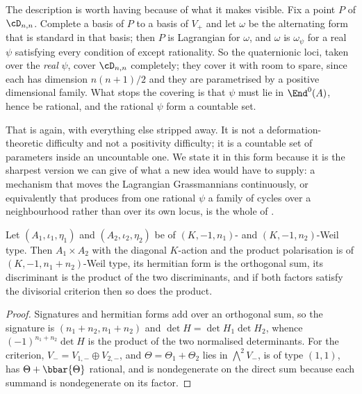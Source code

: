 \begin{remark}%
\label{rem:onlyrational}
The description is worth having because of what it makes visible. Fix a
point $P$ of $\cD_{n,n}$. Complete a basis of $P$ to a basis of $V_{+}$ and
let $\omega$ be the alternating form that is standard in that basis; then $P$
is Lagrangian for $\omega$, and $\omega$ is $\omega_{\psi}$ for a real
$\psi$ satisfying every condition of  except
rationality. So the quaternionic loci, taken over the \emph{real} $\psi$,
cover $\cD_{n,n}$ completely; they cover it with room to spare, since each
has dimension $n(n+1)/2$ and they are parametrised by a positive dimensional
family. What stops the covering is that $\psi$ must lie in
$\End^{0}(A)$, hence be rational, and the rational $\psi$ form a countable
set.

That is  again, with everything else stripped away. It
is not a deformation-theoretic difficulty and not a positivity difficulty;
it is a countable set of parameters inside an uncountable one. We state it in
this form because it is the sharpest version we can give of what a new idea
would have to supply: a mechanism that moves the Lagrangian Grassmannians
continuously, or equivalently that produces from one rational $\psi$ a family
of cycles over a neighbourhood rather than over its own locus, is the whole
of .
\end{remark}

\begin{lemma}[Products]\label{lem:products}
Let $(A_{1},\iota_{1},\eta_{1})$ and $(A_{2},\iota_{2},\eta_{2})$ be of
$(K,-1,n_{1})$- and $(K,-1,n_{2})$-Weil type. Then
$A_{1}\times A_{2}$ with the diagonal $K$-action and the product polarisation
is of $(K,-1,n_{1}+n_{2})$-Weil type, its hermitian form is the orthogonal
sum, its discriminant is the product of the two discriminants, and if both
factors satisfy the divisorial criterion then so does the product.
\end{lemma}

\begin{proof}
Signatures and hermitian forms add over an orthogonal sum, so the signature is
$(n_{1}+n_{2},n_{1}+n_{2})$ and $\det H=\det H_{1}\det H_{2}$, whence
$(-1)^{n_{1}+n_{2}}\det H$ is the product of the two normalised determinants.
For the criterion, $V_{-}=V_{1,-}\oplus V_{2,-}$, and
$\Theta=\Theta_{1}+\Theta_{2}$ lies in $\bigwedge^{2}V_{-}$, is of type
$(1,1)$, has $\Theta+\bbar{\Theta}$ rational, and is nondegenerate on the
direct sum because each summand is nondegenerate on its factor.
\end{proof}

